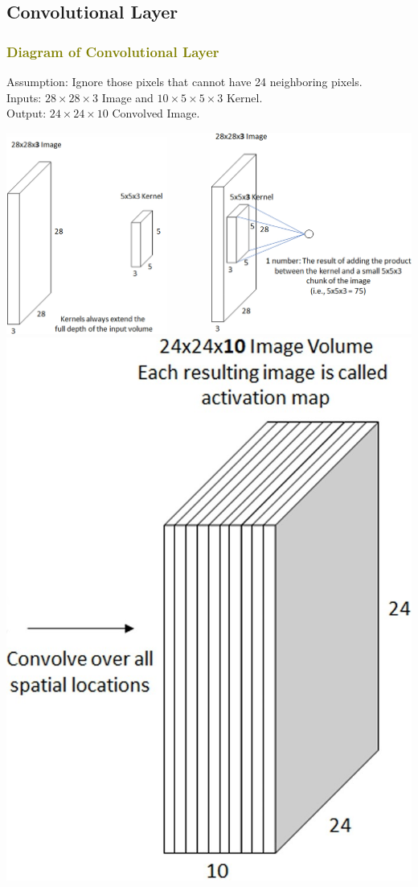 \documentclass{book}
\begin{document}
\subsection{Convolutional Layer}
\textcolor{olive}{\subsubsection{Diagram of Convolutional Layer}}
Assumption: Ignore those pixels that cannot have 24 neighboring pixels.\\
Inputs: $28 \times 28 \times 3$ Image and $10 \times 5 \times 5 \times 3$ Kernel.\\
Output: $24 \times 24 \times 10$ Convolved Image.
\begin{center}
    \includegraphics[scale=0.17]{chapter 9/ch9_figure6.jpeg}
    \includegraphics[scale=0.23]{chapter 9/ch9_figure7.jpeg}
\end{center}
\end{document}
